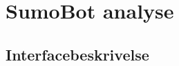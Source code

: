 \section{SumoBot analyse}


\subsection{Interfacebeskrivelse}
                
                
                
                
                

